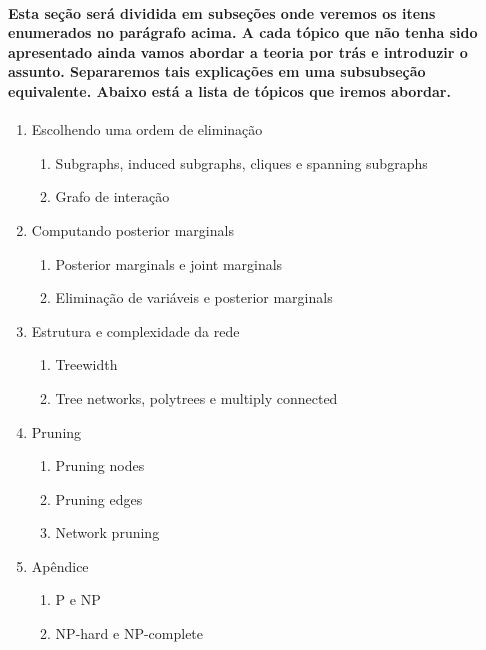 \documentclass[a4paper,10pt]{article}
\theoremstyle{plain}
\begin{document}
\paragraph{
  Esta seção será dividida em subseções onde veremos os itens enumerados no parágrafo acima. A cada
  tópico que não tenha sido apresentado ainda vamos abordar a teoria por trás e introduzir o
  assunto. Separaremos tais explicações em uma subsubseção equivalente. Abaixo está a lista de
  tópicos que iremos abordar.
}

\begin{enumerate}
  \item Escolhendo uma ordem de eliminação
    \begin{enumerate}[label*=\arabic*.]
      \item Subgraphs, induced subgraphs, cliques e spanning subgraphs
      \item Grafo de interação
    \end{enumerate}
  \item Computando posterior marginals
    \begin{enumerate}[label*=\arabic*.]
      \item Posterior marginals e joint marginals
      \item Eliminação de variáveis e posterior marginals
    \end{enumerate}
  \item Estrutura e complexidade da rede
    \begin{enumerate}[label*=\arabic*.]
      \item Treewidth
      \item Tree networks, polytrees e multiply connected
    \end{enumerate}
  \item Pruning
    \begin{enumerate}[label*=\arabic*.]
      \item Pruning nodes
      \item Pruning edges
      \item Network pruning
    \end{enumerate}
  \item Apêndice
    \begin{enumerate}[label*=\arabic*.]
      \item P e NP
      \item NP-hard e NP-complete
    \end{enumerate}
\end{enumerate}
\end{document}
